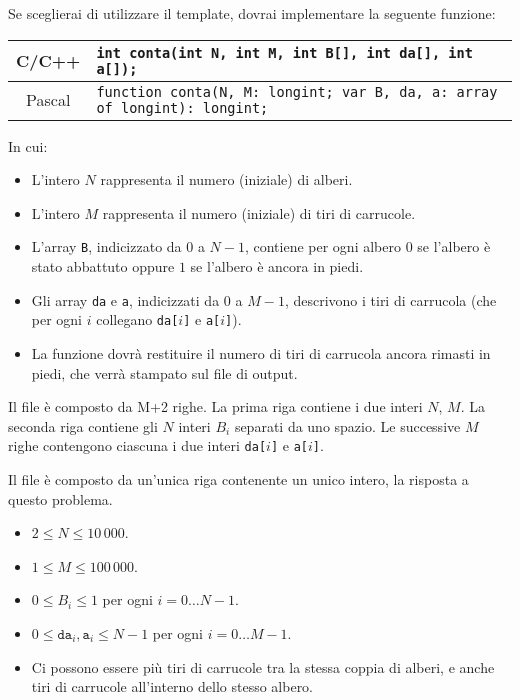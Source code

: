 Se sceglierai di utilizzare il template, dovrai implementare la seguente funzione:
\begin{center}\begin{tabularx}{\textwidth}{|c|X|}
\hline
C/C++  & \verb|int conta(int N, int M, int B[], int da[], int a[]);|\\
\hline
Pascal & \verb|function conta(N, M: longint; var B, da, a: array of longint): longint;|\\
\hline
\end{tabularx}\end{center}
In cui:
\begin{itemize}[nolistsep]
  \item L'intero $N$ rappresenta il numero (iniziale) di alberi.
  \item L'intero $M$ rappresenta il numero (iniziale) di tiri di carrucole.
  \item L'array \texttt{B}, indicizzato da $0$ a $N-1$, contiene per ogni albero $0$ se l'albero \`e stato abbattuto oppure $1$ se l'albero \`e ancora in piedi.
  \item Gli array \texttt{da} e \texttt{a}, indicizzati da $0$ a $M-1$, descrivono i tiri di carrucola (che per ogni $i$ collegano \texttt{da[$i$]} e \texttt{a[$i$]}).
  \item La funzione dovrà restituire il numero di tiri di carrucola ancora rimasti in piedi, che verrà stampato sul file di output.
\end{itemize}

\InputFile
Il file  è composto da M+2 righe. La prima riga contiene i due interi $N$, $M$. La seconda riga contiene gli $N$ interi $B_i$ separati da uno spazio. Le successive $M$ righe contengono ciascuna i due interi \texttt{da[$i$]} e \texttt{a[$i$]}.

\OutputFile
Il file \outputfile{} è composto da un'unica riga contenente un unico intero, la risposta a questo problema.

\pagebreak
\Constraints
\begin{itemize}[nolistsep, itemsep=2mm]
	\item $2 \le N \le 10\,000$.
	\item $1 \le M \le 100\,000$.
	\item $0 \le B_i \le 1$ per ogni $i=0\ldots N-1$.
	\item $0 \le \texttt{da}_i, \texttt{a}_i \le N-1$ per ogni $i=0\ldots M-1$.
	\item Ci possono essere pi\`u tiri di carrucole tra la stessa coppia di alberi, e anche tiri di carrucole all'interno dello stesso albero.
\end{itemize}


